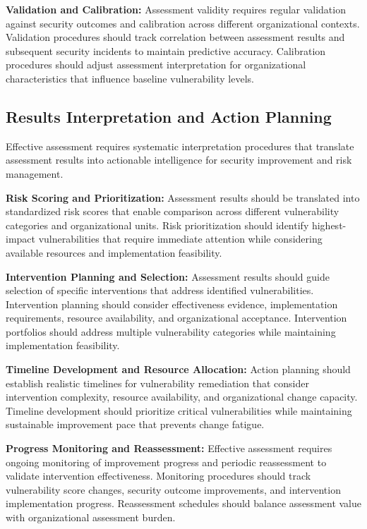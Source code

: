 \documentclass[10pt, twocolumn]{article}
\begin{document}
\textbf{Validation and Calibration:} Assessment validity requires regular validation against security outcomes and calibration across different organizational contexts. Validation procedures should track correlation between assessment results and subsequent security incidents to maintain predictive accuracy. Calibration procedures should adjust assessment interpretation for organizational characteristics that influence baseline vulnerability levels.

\subsection{Results Interpretation and Action Planning}

Effective assessment requires systematic interpretation procedures that translate assessment results into actionable intelligence for security improvement and risk management.

\textbf{Risk Scoring and Prioritization:} Assessment results should be translated into standardized risk scores that enable comparison across different vulnerability categories and organizational units. Risk prioritization should identify highest-impact vulnerabilities that require immediate attention while considering available resources and implementation feasibility.

\textbf{Intervention Planning and Selection:} Assessment results should guide selection of specific interventions that address identified vulnerabilities. Intervention planning should consider effectiveness evidence, implementation requirements, resource availability, and organizational acceptance. Intervention portfolios should address multiple vulnerability categories while maintaining implementation feasibility.

\textbf{Timeline Development and Resource Allocation:} Action planning should establish realistic timelines for vulnerability remediation that consider intervention complexity, resource availability, and organizational change capacity. Timeline development should prioritize critical vulnerabilities while maintaining sustainable improvement pace that prevents change fatigue.

\textbf{Progress Monitoring and Reassessment:} Effective assessment requires ongoing monitoring of improvement progress and periodic reassessment to validate intervention effectiveness. Monitoring procedures should track vulnerability score changes, security outcome improvements, and intervention implementation progress. Reassessment schedules should balance assessment value with organizational assessment burden.
\end{document}
